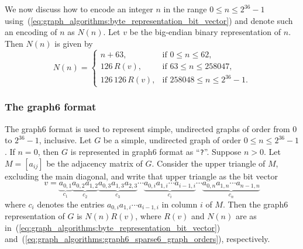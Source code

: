 We now discuss how to encode an integer $n$ in the range
$0 \leq n \leq 2^{36} - 1$
using~(\ref{eq:graph_algorithms:byte_representation_bit_vector}) and
denote such an encoding of $n$ as $N(n)$. Let $v$ be the big-endian
binary representation of $n$. Then $N(n)$ is given by
%
\begin{equation}
\label{eq:graph_algorithms:graph6_sparse6_graph_orders}
N(n)
=
\begin{cases}
n + 63, & \text{if $0 \leq n \leq 62$}, \\
126 \, R(v), & \text{if $63 \leq n \leq 258047$}, \\
126 \, 126 \, R(v), & \text{if $258048 \leq n \leq 2^{36}-1$}.
\end{cases}
\end{equation}



\subsubsection{The graph6 format}

The graph6 format is used to represent simple, undirected graphs of
order from $0$ to $2^{36} - 1$, inclusive. Let $G$ be a simple,
undirected graph of order $0 \leq n \leq 2^{36} - 1$. If $n = 0$, then
$G$ is represented in graph6 format as ``\verb!?!''. Suppose $n >
0$. Let $M = [a_{ij}]$ be the adjacency matrix of $G$. Consider the
upper triangle of $M$, excluding the main diagonal, and write that
upper triangle as the bit vector
\[
v
=
\underbrace{a_{0,1}}_{c_1}
\underbrace{a_{0,2} a_{1,2}}_{c_2}
\underbrace{a_{0,3} a_{1,3} a_{2,3}}_{c_3} \cdots
\underbrace{a_{0,i} a_{1,i} \cdots a_{i-1,i}}_{c_i} \cdots
\underbrace{a_{0,n} a_{1,n} \cdots a_{n-1,n}}_{c_n}
\]
where $c_i$ denotes the entries $a_{0,i} a_{1,i} \cdots a_{i-1,i}$ in
column $i$ of $M$. Then the graph6 representation of $G$ is
$N(n) R(v)$, where $R(v)$ and $N(n)$ are as
in~(\ref{eq:graph_algorithms:byte_representation_bit_vector})
and~(\ref{eq:graph_algorithms:graph6_sparse6_graph_orders}),
respectively.



